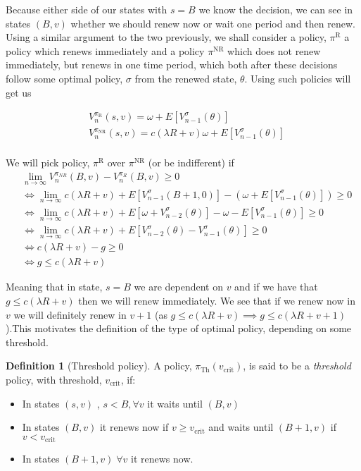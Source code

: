 \documentclass[a4paper,10pt]{article}
\theoremstyle{definition}
\newtheorem{definition}[theorem]{Definition}
\theoremstyle{definition}
\theoremstyle{remark}
\theoremstyle{definition}
\begin{document}
Because either side of our states with $s=B$ we know the decision, we can see in states $(B,v)$ whether we should renew now or wait one period and then renew. Using a similar argument to the two previously, we shall consider a policy, $\pi^{\text{R}}$ a policy which renews immediately and a policy $\pi^{\text{NR}}$ which does not renew immediately, but renews in one time period, which both after these decisions follow some optimal policy, $\sigma$ from the renewed state, $\theta$. Using such policies will get us

\begin{align*}
&V_{n}^{\pi_{\text{R}}}(s,v)= \omega + E[V_{n-1}^{\sigma}(\theta)] \\
&V_{n}^{\pi_{\text{NR}}}(s,v)= c (\lambda R +v) \omega + E[V_{n-1}^{\sigma}(\theta)] \\
\end{align*}

We will pick policy, $\pi^{\text{R}}$ over $\pi^{\text{NR}}$ (or be indifferent) if
\begin{align*}
&\lim\limits_{n \rightarrow \infty} V_{n}^{\pi_{NR}} (B,v) - V_{n}^{\pi_{R}}(B,v) \geq 0 \\
& \iff \lim\limits_{n \rightarrow \infty} c (\lambda R + v) + E[V_{n-1}^{\sigma}(B+1,0)] - (\omega + E[V_{n-1}^{\sigma}(\theta)]) \geq 0 \\
& \iff \lim\limits_{n \rightarrow \infty} c (\lambda R + v)  + E[ \omega + V_{n-2}^{\sigma}(\theta)] - \omega - E[V_{n-1}^{\sigma}(\theta)] \geq 0 \\
& \iff \lim\limits_{n \rightarrow \infty} c(\lambda R + v) + E[V_{n-2}^{\sigma}(\theta) - V_{n-1}^{\sigma}(\theta)] \geq 0 \\
& \iff c (\lambda R+v) - g \geq 0 \\
& \iff g \leq c (\lambda R +v) 
\end{align*}

Meaning that in state, $s=B$ we are dependent on $v$ and if we have that $g \leq c (\lambda R +v)$ then we will renew immediately. We see that if we renew now in $v$ we will definitely renew in $v+1$ (as $g \leq c (\lambda R +v) \implies g \leq c (\lambda R +v+1)$).This motivates the definition of the type of optimal policy, depending on some threshold.

\begin{definition}[Threshold policy]
A policy, $\pi_{\text{Th}}(v_{\text{crit}})$, is said to be a \textit{threshold} policy, with threshold, $v_{\text{crit}}$, if:
\begin{itemize}
\item In states $(s,v)$ , $s < B, \forall v$ it waits until $(B,v)$
\item In states $(B,v)$ it renews now if $v \geq v_{\text{crit}}$ and waits until $(B+1,v)$ if $v < v_{\text{crit}}$
\item In states $(B+1,v) \; \forall v$ it renews now.
\end{itemize}
\end{definition}
\end{document}
